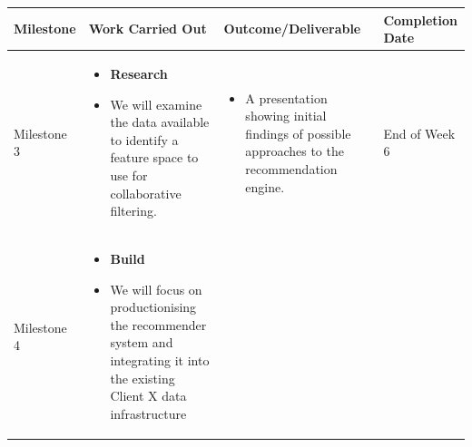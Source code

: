 \documentclass[
]{book}
\providecommand{\tightlist}{%
  \setlength{\itemsep}{0pt}\setlength{\parskip}{0pt}}
\begin{document}
\begin{longtable}[]{@{}llll@{}}
\toprule
\begin{minipage}[b]{0.14\columnwidth}\raggedright
Milestone\strut
\end{minipage} & \begin{minipage}[b]{0.30\columnwidth}\raggedright
Work Carried Out\strut
\end{minipage} & \begin{minipage}[b]{0.30\columnwidth}\raggedright
Outcome/Deliverable\strut
\end{minipage} & \begin{minipage}[b]{0.15\columnwidth}\raggedright
Completion
Date\strut
\end{minipage}\tabularnewline
\midrule
\endhead
\begin{minipage}[t]{0.14\columnwidth}\raggedright
Milestone
3\strut
\end{minipage} & \begin{minipage}[t]{0.30\columnwidth}\raggedright
\begin{itemize}
\tightlist
\item
  \textbf{Research}
\item
  We will examine the
  data available to
  identify a feature
  space to use for
  collaborative
  filtering.
\end{itemize}\strut
\end{minipage} & \begin{minipage}[t]{0.30\columnwidth}\raggedright
\begin{itemize}
\tightlist
\item
  A presentation
  showing initial
  findings of possible
  approaches to the
  recommendation engine.
\end{itemize}\strut
\end{minipage} & \begin{minipage}[t]{0.15\columnwidth}\raggedright
End
of
Week
6\strut
\end{minipage}\tabularnewline
\begin{minipage}[t]{0.14\columnwidth}\raggedright
Milestone
4\strut
\end{minipage} & \begin{minipage}[t]{0.30\columnwidth}\raggedright
\begin{itemize}
\tightlist
\item
  \textbf{Build}
\item
  We will focus on
  productionising the
  recommender system and
  integrating it into
  the existing Client X
  data infrastructure

\end{itemize}
\end{minipage}
\end{longtable}
\end{document}
